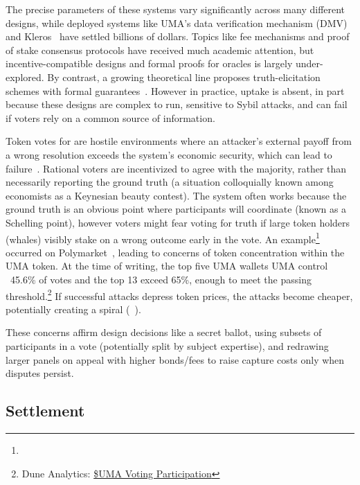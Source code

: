 The precise parameters of these systems vary significantly across many different designs, while deployed systems like UMA's data verification mechanism (DMV)~\cite{uma} and Kleros~\cite{kleros} have settled billions of dollars. Topics like fee mechanisms and proof of stake consensus protocols have received much academic attention, but incentive-compatible designs and formal proofs for oracles is largely under-explored. By contrast, a growing theoretical line proposes truth-elicitation schemes with formal guarantees~\cite{Pre04,SKC25}. However in practice, uptake is absent, in part because these designs are complex to run, sensitive to Sybil attacks, and can fail if voters rely on a common source of information.

Token votes for \depms are hostile environments where an attacker’s external payoff from a wrong resolution exceeds the system’s economic security, which can lead to failure~\cite{FoBo19}. Rational voters are incentivized to agree with the majority, rather than necessarily reporting the ground truth (a situation colloquially known among economists as a Keynesian beauty contest). The system often works because the ground truth is an obvious point where participants will coordinate (known as a Schelling point), however voters might fear voting for truth if large token holders (whales) visibly stake on a wrong outcome early in the vote. An example\footnote{} occurred on Polymarket~\cite{Rey25}, leading to concerns of token concentration within the UMA token. At the time of writing, the top five UMA wallets UMA control ~45.6\% of votes and the top 13 exceed 65\%, enough to meet the passing threshold.\footnote{Dune Analytics: \href{https://dune.com/uma\_protocol/uma-protocol}{\$UMA Voting Participation}} If successful attacks depress token prices, the attacks become cheaper, potentially creating a spiral (\cf~\cite{KM21}). 

These concerns affirm design decisions like a secret ballot, using subsets of participants in a vote (potentially split by subject expertise), and redrawing larger panels on appeal with higher bonds/fees to raise capture costs only when disputes persist.


\subsection{Settlement}\label{wf:clear}

